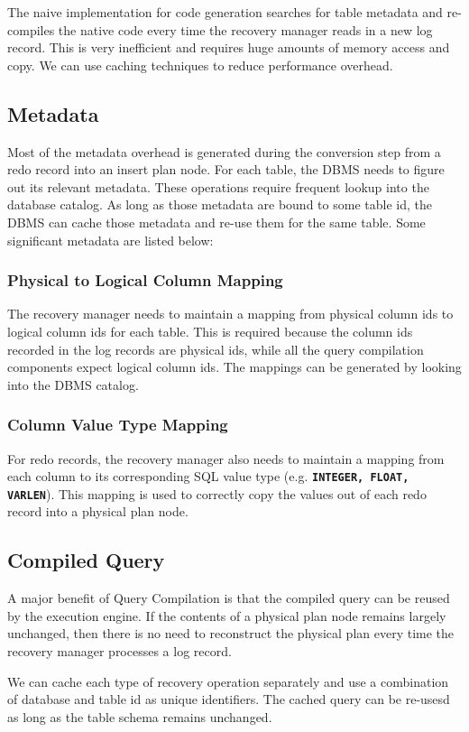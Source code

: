 \documentclass[12pt]{cmuthesis}
\newcommand{\dbSQL}[1]{\texttt{\textbf{#1}}\xspace}
\begin{document}
The naive implementation for code generation searches for table metadata and re-compiles the native code every time the recovery manager reads in a new log record. This is very inefficient and requires huge amounts of memory access and copy. We can use caching techniques to reduce performance overhead.

\subsection{Metadata}
Most of the metadata overhead is generated during the conversion step from a redo record into an insert plan node. For each table, the DBMS needs to figure out its relevant metadata. These operations require frequent lookup into the database catalog. As long as those metadata are bound to some table id, the DBMS can cache those metadata and re-use them for the same table. Some significant metadata are listed below:

\subsubsection{Physical to Logical Column Mapping}
The recovery manager needs to maintain a mapping from physical column ids to logical column ids for each table. This is required because the column ids recorded in the log records are physical ids, while all the query compilation components expect logical column ids. The mappings can be generated by looking into the DBMS catalog.
\subsubsection{Column Value Type Mapping}
For redo records, the recovery manager also needs to maintain a mapping from each column to its corresponding SQL value type (e.g. \dbSQL{INTEGER, FLOAT, VARLEN}). This mapping is used to correctly copy the values out of each redo record into a physical plan node.

\subsection{Compiled Query}
A major benefit of Query Compilation is that the compiled query can be reused by the execution engine. If the contents of a physical plan node remains largely unchanged, then there is no need to reconstruct the physical plan every time the recovery manager processes a log record.

We can cache each type of recovery operation separately and use a combination of database and table id as unique identifiers. The cached query can be re-usesd as long as the table schema remains unchanged.
\end{document}
